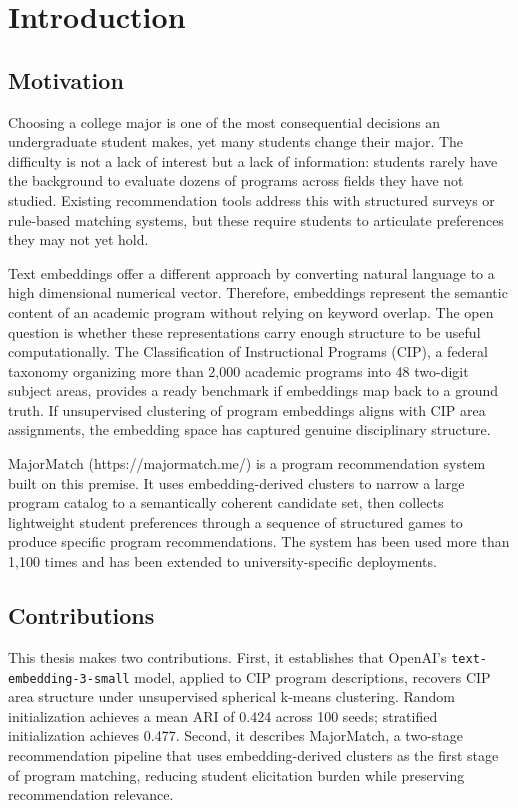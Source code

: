 
\chapter{Introduction}

\section{Motivation}

Choosing a college major is one of the most consequential decisions an undergraduate student makes, yet many students change their major. The difficulty is not a lack of interest but a lack of information: students rarely have the background to evaluate dozens of programs across fields they have not studied. Existing recommendation tools address this with structured surveys or rule-based matching systems, but these require students to articulate preferences they may not yet hold.

Text embeddings offer a different approach by converting natural language to a high dimensional numerical vector. Therefore, embeddings represent the semantic content of an academic program without relying on keyword overlap. The open question is whether these representations carry enough structure to be useful computationally. The Classification of Instructional Programs (CIP), a federal taxonomy organizing more than 2,000 academic programs into 48 two-digit subject areas, provides a ready benchmark if embeddings map back to a ground truth. If unsupervised clustering of program embeddings aligns with CIP area assignments, the embedding space has captured genuine disciplinary structure.

MajorMatch (https://majormatch.me/) is a program recommendation system built on this premise. It uses embedding-derived clusters to narrow a large program catalog to a semantically coherent candidate set, then collects lightweight student preferences through a sequence of structured games to produce specific program recommendations. The system has been used more than 1,100 times and has been extended to university-specific deployments.

\section{Contributions}

This thesis makes two contributions. First, it establishes that OpenAI's \texttt{text-embedding-3-small} model, applied to CIP program descriptions, recovers CIP area structure under unsupervised spherical k-means clustering. Random initialization achieves a mean ARI of 0.424 across 100 seeds; stratified initialization achieves 0.477. Second, it describes MajorMatch, a two-stage recommendation pipeline that uses embedding-derived clusters as the first stage of program matching, reducing student elicitation burden while preserving recommendation relevance.

